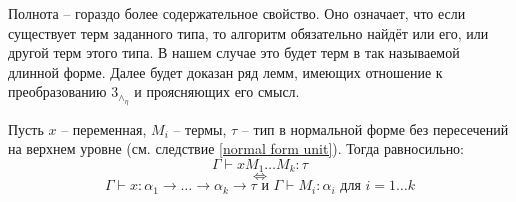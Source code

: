 \documentclass{spbau-diploma}
\begin{document}
Полнота -- гораздо более содержательное свойство. Оно означает, что если существует терм заданного типа, то алгоритм обязательно найдёт или его, или другой терм этого типа. В нашем случае это будет терм в так называемой длинной форме.
Далее будет доказан ряд лемм, имеющих отношение к преобразованию $3_\wedge_\eta$ и проясняющих его смысл. 

\begin{lemma} \label{необходимая типизация}

Пусть $x$ -- переменная, $M_i$ -- термы, $\tau$ -- тип в нормальной форме без пересечений на верхнем уровне (см. следствие \ref{normal form unit}). Тогда равносильно: 
    $$\Gamma \vdash x M_1 \dots M_k \colon \tau$$ 
    $$\iff$$
    $$\Gamma \vdash x \colon \alpha_1 \to \dots \to \alpha_k \to \tau \text{ и } \Gamma \vdash M_i \colon \alpha_i \text{ для } i = 1 \dots k$$
\end{lemma}
\end{document}
